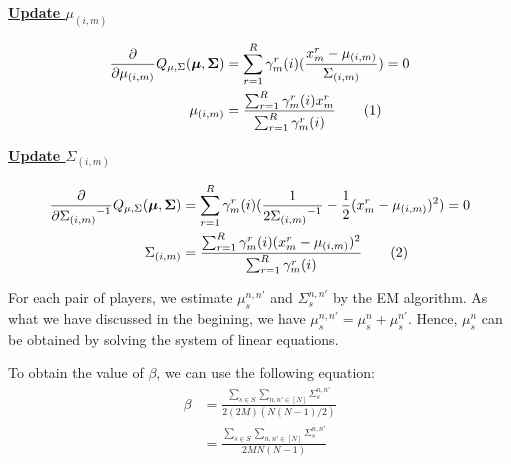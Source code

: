 \documentclass[12pt]{article}
\newcommand\numberthis{\addtocounter{equation}{1}\tag{\theequation}}
\newenvironment{problem}[2][Problem]{\begin{trivlist}
\item[\hskip \labelsep {\bfseries #1}\hskip \labelsep {\bfseries #2.}]}{\end{trivlist}}
\begin{document}
\begin{problem}{2.6.18}
\begin{flushleft}
    \textbf{\underline{Update $\mu_{(i,m)}$}}
\end{flushleft}

\begin{align*}
    \frac{\partial}{\partial \mu_{(i,m)}}Q_{\mu, \Sigma}(\bm{\mu}, \bm{\Sigma}) 
    &= \sum_{r=1}^{R} \gamma^{r}_{m}(i)(\frac{x^r_m - \mu_{(i,m)}}{\Sigma_{(i,m)}}) = 0 \\
    \mu_{(i,m)}
    &= \frac{\sum_{r=1}^{R}\gamma^{r}_{m}(i)x^r_m}{\sum_{r=1}^{R}\gamma^{r}_{m}(i)}
            \numberthis \label{eq:Q26-updateMu}
\end{align*}

\begin{flushleft}
    \textbf{\underline{Update $\Sigma_{(i,m)}$}}
\end{flushleft}

\begin{align*}
    \frac{\partial}{\partial {\Sigma_{(i,m)}}^{-1}}Q_{\mu, \Sigma}(\bm{\mu}, \bm{\Sigma}) 
    &= \sum_{r=1}^{R} \gamma^{r}_{m}(i)(\frac{1}{2{\Sigma_{(i,m)}}^{-1}} - \frac{1}{2}(x^r_m - \mu_{(i,m)})^2) = 0 \\
    \Sigma_{(i,m)}
    &= \frac{\sum_{r=1}^{R}\gamma^{r}_{m}(i)(x^r_m - \mu_{(i,m)})^2}
            {\sum_{r=1}^{R}\gamma^{r}_{m}(i)}  \numberthis \label{eq:Q26-updateSigma}
\end{align*}

For each pair of players, we estimate $\mu_s^{n,n'}$ and $\Sigma_s^{n,n'}$ by the
EM algorithm.
As what we have discussed in the begining, we have $\mu_s^{n,n'} = \mu_s^{n} + \mu_s^{n'}$.
Hence, $\mu_s^{n}$ can be obtained by solving the system of linear equations.

To obtain the value of $\beta$, we can use the following equation:
\begin{align*}
    \beta &= \frac{\sum_{s \in S}\sum_{n, n' \in [N]}\Sigma_s^{n,n'}}{2(2M)(N(N-1)/2)} \\
    &= \frac{\sum_{s \in S}\sum_{n, n' \in [N]}\Sigma_s^{n,n'}}{2 M N(N-1)} \\
\end{align*}
\end{problem}
\end{document}
